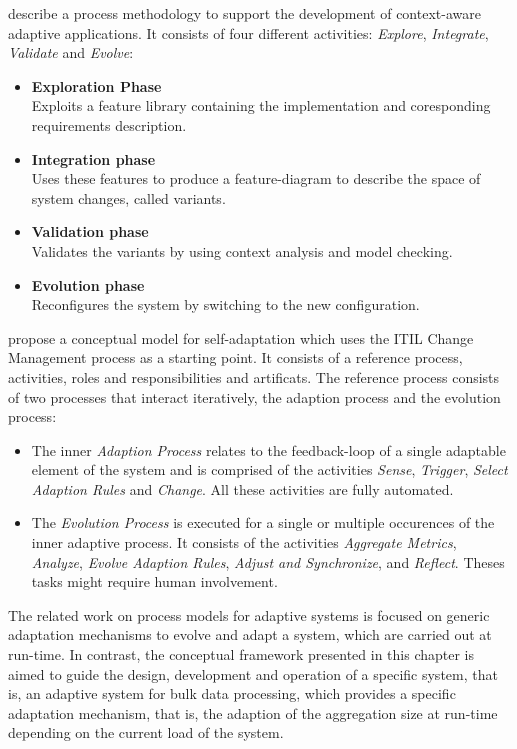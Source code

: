 \cite{Inverardi:2010ki} describe a process methodology to support the development of context-aware adaptive applications. It consists of four different activities: \emph{Explore}, \emph{Integrate}, \emph{Validate} and \emph{Evolve}:
\begin{itemize}
	\item \textbf{Exploration Phase}\\
	Exploits a feature library containing the implementation and coresponding requirements description.
	\item \textbf{Integration phase}\\
	Uses these features to produce a feature-diagram to describe the space of system changes, called variants.
	\item \textbf{Validation phase}\\
	Validates the variants by using context analysis and model checking.
	\item \textbf{Evolution phase}\\
	Reconfigures the system by switching to the new configuration.
\end{itemize}

\cite{Gacek:2008ei} propose a conceptual model for self-adaptation which uses the ITIL Change Management process as a starting point. It consists of a reference process, activities, roles and responsibilities and artificats. The reference process consists of two processes that interact iteratively, the adaption process and the evolution process:
\begin{itemize}
	\item The inner \emph{Adaption Process} relates to the feedback-loop of a single adaptable element of the system and is comprised of the activities \emph{Sense}, \emph{Trigger}, \emph{Select Adaption Rules} and \emph{Change}. All these activities are fully automated.
	\item The \emph{Evolution Process} is executed for a single or multiple occurences of the inner adaptive process. It consists of the activities \emph{Aggregate Metrics}, \emph{Analyze}, \emph{Evolve Adaption Rules}, \emph{Adjust and Synchronize}, and \emph{Reflect}. Theses tasks might require human involvement.
\end{itemize}

The related work on process models for adaptive systems is focused on generic adaptation mechanisms to evolve and adapt a system, which are carried out at run-time. In contrast, the conceptual framework presented in this chapter is aimed to guide the design, development and operation of a specific system, that is, an adaptive system for bulk data processing, which provides a specific adaptation mechanism, that is, the adaption of the aggregation size at run-time depending on the current load of the system.

